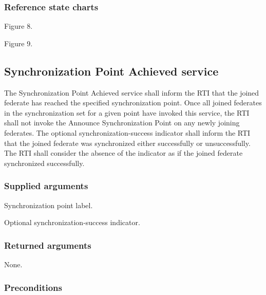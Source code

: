 \clearpage


\subsubsection{Reference state charts}

\begin{stdalphalist}
    \item Figure 8.
    \item Figure 9.
\end{stdalphalist}

\subsection{Synchronization Point Achieved service}

The Synchronization Point Achieved service shall inform the RTI that the joined federate has reached the specified synchronization point. Once all joined federates in the synchronization set for a given point have invoked this service, the RTI shall not invoke the Announce Synchronization Point \rtiinitiated{} on any newly joining federates. The optional synchronization-success indicator shall inform the RTI that the joined federate was synchronized either successfully or unsuccessfully. The RTI shall consider the absence of the indicator as if the joined federate synchronized successfully.

\subsubsection{Supplied arguments}

\begin{stdalphalist}
    \item Synchronization point label.
    \item Optional synchronization-success indicator.
\end{stdalphalist}

\subsubsection{Returned arguments}

\begin{stdalphalist}
    \item None.
\end{stdalphalist}

\subsubsection{Preconditions}

